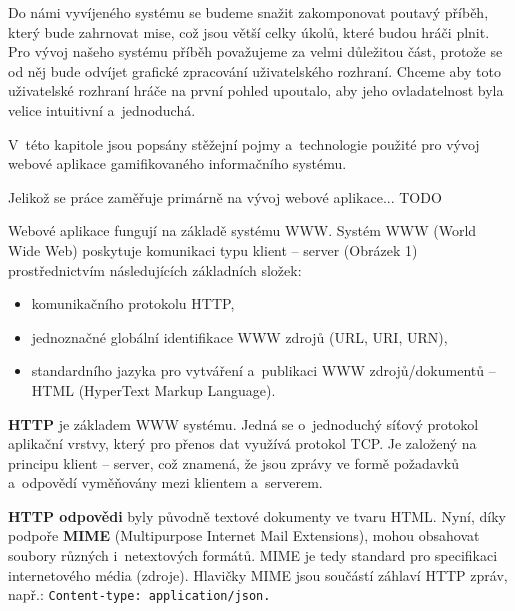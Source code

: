 \documentclass[12pt]{article}
\begin{document}
\par
Do námi vyvíjeného systému se budeme snažit zakomponovat poutavý příběh,
který bude zahrnovat mise, což jsou větší celky úkolů, které budou hráči plnit.
Pro vývoj našeho systému příběh považujeme za velmi důležitou část,
protože se od něj bude odvíjet grafické zpracování uživatelského rozhraní. 
Chceme aby toto uživatelské rozhraní hráče na první pohled upoutalo, aby jeho ovladatelnost byla velice intuitivní a~jednoduchá. 

\par


V~této kapitole jsou popsány stěžejní pojmy a~technologie použité pro vývoj webové aplikace
gamifikovaného informačního systému. 

Jelikož se práce zaměřuje primárně na vývoj webové aplikace... TODO

Webové aplikace fungují na základě systému WWW. 
Systém WWW (World Wide Web) poskytuje komunikaci typu klient -- server (Obrázek 1)
prostřednictvím následujících základních složek:

\begin{itemize}
\item komunikačního protokolu HTTP, 
\item jednoznačné globální identifikace WWW zdrojů (URL, URI, URN),
\item standardního jazyka pro vytváření a~publikaci WWW zdrojů/dokumentů -- HTML
(HyperText Markup Language).
\end{itemize}

\obrazek
{}

\textbf{HTTP} je základem  WWW systému. 
Jedná se o~jednoduchý síťový protokol aplikační vrstvy, 
který pro přenos dat využívá protokol TCP. 
Je založený na principu klient -- server, 
což znamená, že jsou zprávy ve formě požadavků a~odpovědí vyměňovány mezi klientem 
a~serverem. 

\textbf{HTTP odpovědi} byly původně textové dokumenty ve tvaru HTML.
Nyní, díky podpoře \textbf{MIME} (Multipurpose Internet Mail Extensions),
mohou obsahovat soubory různých i~netextových formátů.
MIME je tedy standard pro specifikaci internetového média (zdroje).
Hlavičky MIME jsou součástí záhlaví HTTP zpráv, např.: \texttt{Content-type:~application/json.} 
\end{document}
